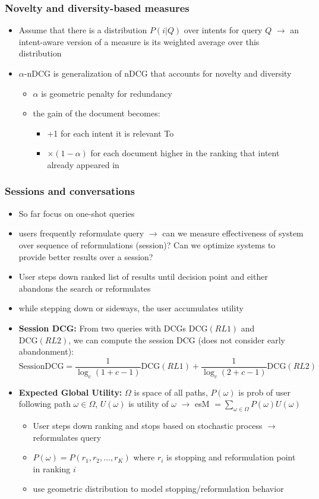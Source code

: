 \subsubsection{Novelty and diversity-based measures}
\begin{itemize}
	\item Assume that there is a distribution $P(i|Q)$ over intents for query $Q$ $\rightarrow$ an intent-aware version of a measure is its weighted average over this distribution 
	\item $\alpha$-nDCG is generalization of nDCG that accounts for novelty and diversity
	\begin{itemize}
		\item $\alpha$ is geometric penalty for redundancy
		\item the gain of the document becomes:
		\begin{itemize}
			\item +1 for each intent it is relevant To
			\item $\times(1-\alpha)$ for each document higher in the ranking that intent already appeared in
		\end{itemize}
	\end{itemize}
\end{itemize}
\subsubsection{Sessions and conversations}
\begin{itemize}
	\item So far focus on one-shot queries
	\item users frequently reformulate query $\rightarrow$ can we measure effectiveness of system over sequence of reformulations (session)? Can we optimize systems to provide better results over a session?
	\item User steps down ranked list of results until decision point and either abandons the search or reformulates
	\item while stepping down or sideways, the user accumulates utility
	\item \textbf{Session DCG:} From two queries with DCGs $\mathrm{DCG}(RL1)$ and $\mathrm{DCG}(RL2)$, we can compute the session DCG (does not consider early abandonment):
	$$
	\mathrm{SessionDCG} = \dfrac{1}{\log_c (1 + c -1)}\mathrm{DCG}(RL1) + \dfrac{1}{\log_c (2 + c -1)}\mathrm{DCG}(RL2)
	$$
	\item \textbf{Expected Global Utility:} $\Omega$ is space of all paths, $P(\omega)$ is prob of user following path $\omega \in \Omega$, $U(\omega)$ is utility of $\omega$ $\rightarrow$ esM $= \sum_{\omega \in \Omega} P(\omega) U(\omega)$
	\begin{itemize}
		\item User steps down ranking and stops based on stochastic process $\rightarrow$ reformulates query
		\item $P(\omega) = P(r_1, r_2, \dots, r_K)$ where $r_i$ is stopping and reformulation point in ranking $i$
		\item use geometric distribution to model stopping/reformulation behavior
	\end{itemize}
\end{itemize}
